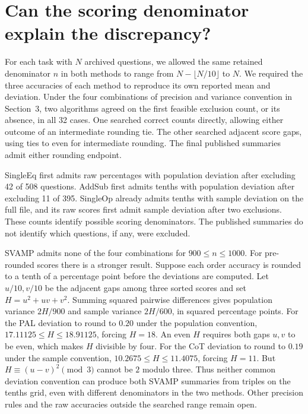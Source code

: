 \section{Can the scoring denominator explain the discrepancy?}
For each task with $N$ archived questions, we allowed the same retained denominator $n$ in both methods to range from $N-\lfloor N/10\rfloor$ to $N$. We required the three accuracies of each method to reproduce its own reported mean and deviation. Under the four combinations of precision and variance convention in Section~3, two algorithms agreed on the first feasible exclusion count, or its absence, in all 32 cases. One searched correct counts directly, allowing either outcome of an intermediate rounding tie. The other searched adjacent score gaps, using ties to even for intermediate rounding. The final published summaries admit either rounding endpoint.

SingleEq first admits raw percentages with population deviation after excluding 42 of 508 questions. AddSub first admits tenths with population deviation after excluding 11 of 395. SingleOp already admits tenths with sample deviation on the full file, and its raw scores first admit sample deviation after two exclusions. These counts identify possible scoring denominators. The published summaries do not identify which questions, if any, were excluded.

SVAMP admits none of the four combinations for $900\le n\le1000$. For pre-rounded scores there is a stronger result. Suppose each order accuracy is rounded to a tenth of a percentage point before the deviations are computed. Let $u/10,v/10$ be the adjacent gaps among three sorted scores and set $H=u^2+uv+v^2$. Summing squared pairwise differences gives population variance $2H/900$ and sample variance $2H/600$, in squared percentage points. For the PAL deviation to round to $0.20$ under the population convention, $17.11125\le H\le18.91125$, forcing $H=18$. An even $H$ requires both gaps $u,v$ to be even, which makes $H$ divisible by four. For the CoT deviation to round to $0.19$ under the sample convention, $10.2675\le H\le11.4075$, forcing $H=11$. But $H\equiv(u-v)^2\pmod{3}$ cannot be $2$ modulo three. Thus neither common deviation convention can produce both SVAMP summaries from triples on the tenths grid, even with different denominators in the two methods. Other precision rules and the raw accuracies outside the searched range remain open.
